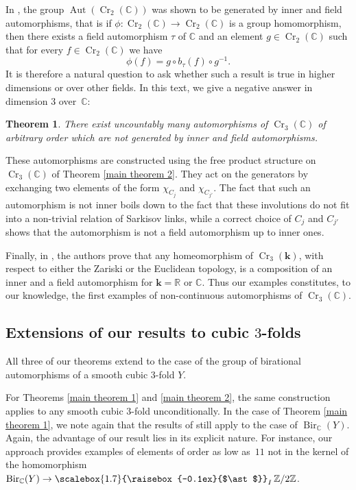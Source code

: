 \documentclass[JEP,XML,SOM,Unicode,published]{cedram}
\theoremstyle{plain}
\newtheorem{introductiontheorem}{Theorem}
\theoremstyle{definition}
\newcommand\Aut{\operatorname{Aut}}
\newcommand\Bir{\operatorname{Bir}}
\newcommand\Cr{\operatorname{Cr}}
\newcommand{\ZZ}{\mathbb{Z}}
\newcommand{\RR}{\mathbb{R}}
\newcommand{\CC}{\mathbb{C}}
\newcommand{\kk}{\boldsymbol{k}}
\newcommand{\freeprod}{\mathop{\scalebox{1.7}{\raisebox{-0.1ex}{$\ast$}}}}
\begin{document}
In \cite{MR2278755}, the group $\Aut(\Cr_2(\CC))$ was shown to be generated by inner and field automorphisms, that is if $\phi\colon \Cr_2(\CC) \to \Cr_2(\CC)$ is a group homomorphism, then there exists a field automorphism $\tau$ of $\CC$ and an element $g\in \Cr_2(\CC)$ such that for every $f \in \Cr_2(\CC)$ we have
\[
\phi(f) = g\circ b_{\tau}(f) \circ g^{-1}.
\]
It is therefore a natural question to ask whether such a result is true in higher dimen\-sions or over other fields.
In this text, we give a negative answer in dimension $3$ over~$\CC$:

\begin{introductiontheorem}\label{main theorem 3}
There exist uncountably many automorphisms of $\Cr_3(\CC)$ of arbitrary order which are not generated by inner and field automorphisms.
\end{introductiontheorem}

These automorphisms are constructed using the free product structure on $\Cr_3(\CC)$ of Theorem \ref{main theorem 2}. They act on the generators by exchanging two elements of the form $\chi_{C_j}$ and $\chi_{C_{j'}}$.
The fact that such an automorphism is not inner boils down to the fact that these involutions do not fit into a non-trivial relation of Sarkisov links, while a correct choice of $C_j$ and $C_{j'}$ shows that the automorphism is not a field automorphism up to inner ones.

Finally, in \cite{ContinuousAutomorphisms}, the authors prove that any homeomorphism of $\Cr_3(\kk)$, with respect to either the Zariski or the Euclidean topology, is a composition of an inner and a field automorphism for $\kk = \RR$ or $\CC$.
Thus our examples constitutes, to our knowledge, the first examples of non-continuous automorphisms of $\Cr_3(\CC)$.

\subsection{Extensions of our results to cubic $3$-folds}

All three of our theorems extend to the case of the group of birational automorphisms of a smooth cubic $3$-fold $Y$.

For Theorems \ref{main theorem 1} and \ref{main theorem 2}, the same construction applies to any smooth cubic $3$-fold unconditionally.
In the case of Theorem \ref{main theorem 1}, we note again that the results of \cite{BLZ} still apply to the case of $\Bir_{\CC}(Y)$. Again, the advantage of our result lies in its explicit nature.
For instance, our approach provides examples of elements of order as low as~$11$ not in the kernel of the homomorphism $\Bir_{\CC}(Y) \to \freeprod_I \ZZ/2\ZZ$.
\end{document}
